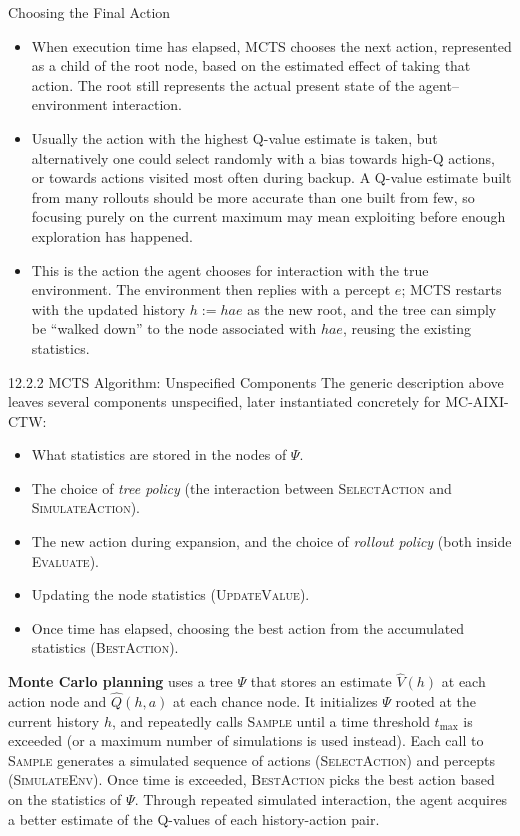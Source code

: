 \documentclass[aspectratio=169,10pt]{beamer}
\begin{document}
\begin{frame}{Choosing the Final Action}
\begin{itemize}
\item When execution time has elapsed, MCTS chooses the next action, represented as a
child of the root node, based on the estimated effect of taking that action. The root
still represents the actual present state of the agent--environment interaction.
\item Usually the action with the highest Q-value estimate is taken, but alternatively one
could select randomly with a bias towards high-Q actions, or towards actions visited most
often during backup. A Q-value estimate built from many rollouts should be more accurate
than one built from few, so focusing purely on the current maximum may mean exploiting
before enough exploration has happened.
\item This is the action the agent chooses for interaction with the true environment. The
environment then replies with a percept $e$; MCTS restarts with the updated history
$h:=hae$ as the new root, and the tree can simply be ``walked down'' to the node
associated with $hae$, reusing the existing statistics.
\end{itemize}
\end{frame}

\begin{frame}{12.2.2 MCTS Algorithm: Unspecified Components}
The generic description above leaves several components unspecified, later instantiated
concretely for MC-AIXI-CTW:
\begin{itemize}
\item What statistics are stored in the nodes of $\Psi$.
\item The choice of \emph{tree policy} (the interaction between \textsc{SelectAction} and
\textsc{SimulateAction}).
\item The new action during expansion, and the choice of \emph{rollout policy} (both
inside \textsc{Evaluate}).
\item Updating the node statistics (\textsc{UpdateValue}).
\item Once time has elapsed, choosing the best action from the accumulated statistics
(\textsc{BestAction}).
\end{itemize}
\textbf{Monte Carlo planning} uses a tree $\Psi$ that stores an estimate $\widehat V(h)$ at
each action node and $\widehat Q(h,a)$ at each chance node. It initializes $\Psi$ rooted at
the current history $h$, and repeatedly calls \textsc{Sample} until a time threshold
$t_{\max}$ is exceeded (or a maximum number of simulations is used instead). Each call to
\textsc{Sample} generates a simulated sequence of actions (\textsc{SelectAction}) and
percepts (\textsc{SimulateEnv}). Once time is exceeded, \textsc{BestAction} picks the best
action based on the statistics of $\Psi$. Through repeated simulated interaction, the
agent acquires a better estimate of the Q-values of each history-action pair.
\end{frame}
\end{document}
